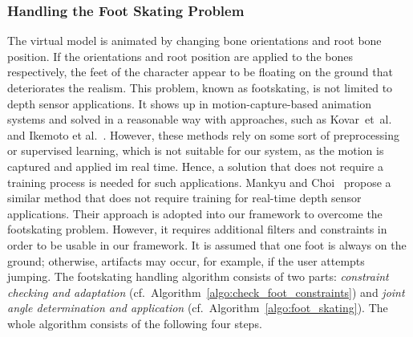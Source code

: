 \documentclass[number,preprint,review,12pt]{elsarticle}
\begin{document}
{\color{red} 
\subsubsection{Handling the Foot Skating Problem}
\label{section_foot_skating}
The virtual model is animated by changing bone orientations and root bone position. If the orientations and root position are applied to the bones respectively, the feet of the character appear to be floating on the ground that deteriorates the realism. 
This problem, known as footskating, is not limited to depth sensor applications. It shows up in motion-capture-based animation systems and solved in a reasonable way with approaches, such as Kovar~et~al.~\cite{Kovar2002} and Ikemoto et al.~\cite{Ikemoto2006}. However, these methods rely on some sort of preprocessing or supervised learning, which is not suitable for our system, as the motion is captured and applied im real time. Hence, a solution that does not require a training process is needed for such applications. Mankyu and Choi~\cite{Mankyu2013} propose a similar method that does not require training for real-time depth sensor applications. Their approach is adopted into our framework to overcome the footskating problem. However, it requires additional filters and constraints in order to be usable in our framework. It is assumed that one foot is always on the ground; otherwise, artifacts may occur, for example, if the user attempts jumping. The footskating handling algorithm consists of two parts: {\em constraint checking and adaptation} (cf.~Algorithm~\ref{algo:check_foot_constraints}) and {\em joint angle determination and application} (cf.~Algorithm~\ref{algo:foot_skating}). The whole   algorithm consists of the following four steps. 
}
\end{document}
